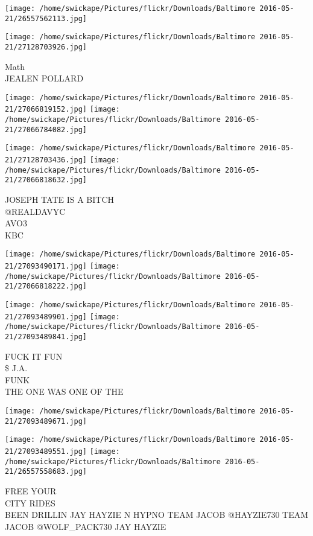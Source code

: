 \documentclass[10pt,letterpaper]{article}
\begin{document}
\texttt{[image: /home/swickape/Pictures/flickr/Downloads/Baltimore 2016-05-21/26557562113.jpg]}

\vspace{0.25in}
\texttt{[image: /home/swickape/Pictures/flickr/Downloads/Baltimore 2016-05-21/27128703926.jpg]}

Math\\
JEALEN POLLARD\\
\pagebreak

\texttt{[image: /home/swickape/Pictures/flickr/Downloads/Baltimore 2016-05-21/27066819152.jpg]}
\texttt{[image: /home/swickape/Pictures/flickr/Downloads/Baltimore 2016-05-21/27066784082.jpg]}

\texttt{[image: /home/swickape/Pictures/flickr/Downloads/Baltimore 2016-05-21/27128703436.jpg]}
\texttt{[image: /home/swickape/Pictures/flickr/Downloads/Baltimore 2016-05-21/27066818632.jpg]}

JOSEPH TATE IS A BITCH\\
@REALDAVYC\\
AVO3\\
KBC\\
\pagebreak

\texttt{[image: /home/swickape/Pictures/flickr/Downloads/Baltimore 2016-05-21/27093490171.jpg]}
\texttt{[image: /home/swickape/Pictures/flickr/Downloads/Baltimore 2016-05-21/27066818222.jpg]}

\texttt{[image: /home/swickape/Pictures/flickr/Downloads/Baltimore 2016-05-21/27093489901.jpg]}
\texttt{[image: /home/swickape/Pictures/flickr/Downloads/Baltimore 2016-05-21/27093489841.jpg]}

FUCK IT FUN\\
\$ J.A.\\
FUNK\\
THE ONE WAS ONE OF THE\\
\pagebreak

\texttt{[image: /home/swickape/Pictures/flickr/Downloads/Baltimore 2016-05-21/27093489671.jpg]}

\vspace{0.25in}
\texttt{[image: /home/swickape/Pictures/flickr/Downloads/Baltimore 2016-05-21/27093489551.jpg]}
\texttt{[image: /home/swickape/Pictures/flickr/Downloads/Baltimore 2016-05-21/26557558683.jpg]}

FREE YOUR\\
CITY RIDES\\
BEEN DRILLIN JAY HAYZIE N HYPNO TEAM JACOB @HAYZIE730 TEAM JACOB @WOLF\_PACK730 JAY HAYZIE\\
\pagebreak
\end{document}
